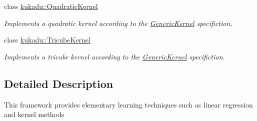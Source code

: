 \begin{DoxyCompactItemize}
class \hyperlink{classkukadu_1_1QuadraticKernel}{kukadu\-::\-Quadratic\-Kernel}
\begin{DoxyCompactList}\small\item\em Implements a quadratic kernel according to the \hyperlink{classkukadu_1_1GenericKernel}{Generic\-Kernel} specifiction. \end{DoxyCompactList}\item 
class \hyperlink{classkukadu_1_1TricubeKernel}{kukadu\-::\-Tricube\-Kernel}
\begin{DoxyCompactList}\small\item\em Implements a tricube kernel according to the \hyperlink{classkukadu_1_1GenericKernel}{Generic\-Kernel} specifiction. \end{DoxyCompactList}\end{DoxyCompactItemize}


\subsection{Detailed Description}
This framework provides elementary learning techniques such as linear regression and kernel methods 
